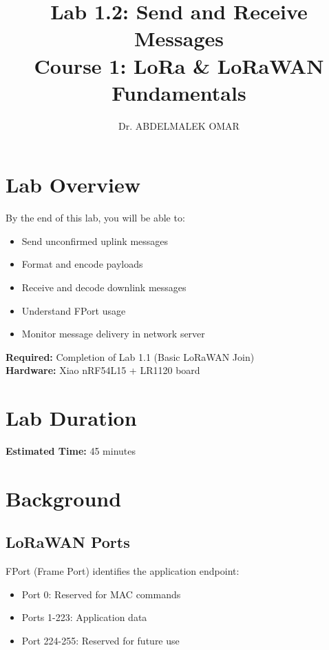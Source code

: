 \documentclass[11pt,a4paper]{article}
\title{\textbf{Lab 1.2: Send and Receive Messages}\\
\large Course 1: LoRa \& LoRaWAN Fundamentals}
\author{Dr. ABDELMALEK OMAR}
\date{}
\begin{document}
\maketitle
\thispagestyle{fancy}

\section{Lab Overview}

\begin{objectivebox}
By the end of this lab, you will be able to:
\begin{itemize}
    \item Send unconfirmed uplink messages
    \item Format and encode payloads
    \item Receive and decode downlink messages
    \item Understand FPort usage
    \item Monitor message delivery in network server
\end{itemize}
\end{objectivebox}

\begin{prereqbox}
\textbf{Required:} Completion of Lab 1.1 (Basic LoRaWAN Join)\\
\textbf{Hardware:} Xiao nRF54L15 + LR1120 board
\end{prereqbox}

\section{Lab Duration}
\textbf{Estimated Time:} 45 minutes

\section{Background}

\subsection{LoRaWAN Ports}
FPort (Frame Port) identifies the application endpoint:
\begin{itemize}
    \item Port 0: Reserved for MAC commands
    \item Ports 1-223: Application data
    \item Port 224-255: Reserved for future use
\end{itemize}
\end{document}
